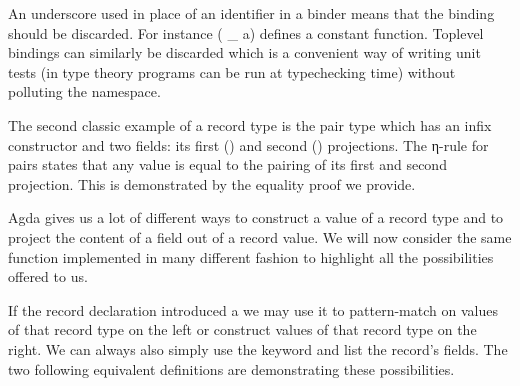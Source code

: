 \begin{feature}
\label{feature:placeholder}
An underscore used in place of an identifier in a binder means that the binding
should be discarded. For instance {( \_  a)} defines a constant function.
Toplevel bindings can similarly be discarded which is a convenient way of
writing unit tests (in type theory programs can be run at typechecking time)
without polluting the namespace.
\end{feature}

The second classic example of a record type is the pair type  which
has an infix constructor \AIC{\_,\_} and two fields: its first () and
second () projections. The η-rule for pairs states that any value is
equal to the pairing of its first and second projection. This is demonstrated
by the equality proof we provide.


\begin{minipage}[t]{0.5\textwidth}
\end{minipage}
\begin{minipage}[t]{0.5\textwidth}
\end{minipage}


Agda gives us a lot of different ways to construct a value of a record type
and to project the content of a field out of a record value. We will now
consider the same function  implemented in many different fashion
to highlight all the possibilities offered to us.

If the record declaration introduced a  we may use it to
pattern-match on values of that record type on the left or construct
values of that record type on the right. We can always also simply use
the  keyword and list the record's fields. The two following
equivalent definitions are demonstrating these possibilities.

\begin{minipage}[t]{0.5\textwidth}
\end{minipage}\begin{minipage}[t]{0.5\textwidth}
\end{minipage}

